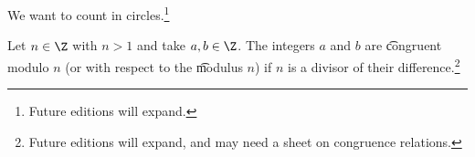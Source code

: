

We want to count in circles.\footnote{Future editions will expand.}


Let $n \in \Z$ with $n > 1$ and take $a, b \in \Z$.
The integers $a$ and $b$ are \t{congruent modulo} $n$ (or with respect to the \t{modulus} $n$) if $n$ is a divisor of their difference.\footnote{Future editions will expand, and may need a sheet on congruence relations.}



\blankpage
